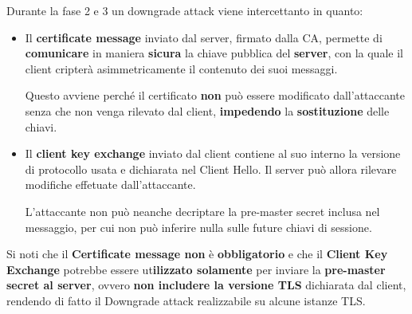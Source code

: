 \begin{proposition}
Durante la fase 2 e 3 un downgrade attack viene intercettanto in quanto:
\begin{itemize}
    \item Il \textbf{certificate message} inviato dal server, firmato dalla CA, permette di \textbf{comunicare} in maniera \textbf{sicura} la chiave pubblica del \textbf{server}, con la quale il client cripterà asimmetricamente il contenuto dei suoi messaggi.\\
    \begin{remark}
    Questo avviene perché il certificato \textbf{non} può essere modificato dall'attaccante senza che non venga rilevato dal client, \textbf{impedendo} la \textbf{sostituzione} delle chiavi.
    \end{remark}
    \item Il \textbf{client key exchange} inviato dal client contiene al suo interno la versione di protocollo usata e dichiarata nel Client Hello. Il server può allora rilevare modifiche effetuate dall'attaccante.\\
    \begin{remark}
    L'attaccante non può neanche decriptare la pre-master secret inclusa nel messaggio, per cui non può inferire nulla sulle future chiavi di sessione.
    \end{remark}
\end{itemize}
\end{proposition}\pagebreak
\begin{note}
Si noti che il \textbf{Certificate message non} è \textbf{obbligatorio} e che il \textbf{Client Key Exchange} potrebbe essere ut\textbf{ilizzato solamente} per inviare la \textbf{pre-master secret al server}, ovvero \textbf{non includere la versione TLS} dichiarata dal client, rendendo di fatto il Downgrade attack realizzabile su alcune istanze TLS.
\end{note}
